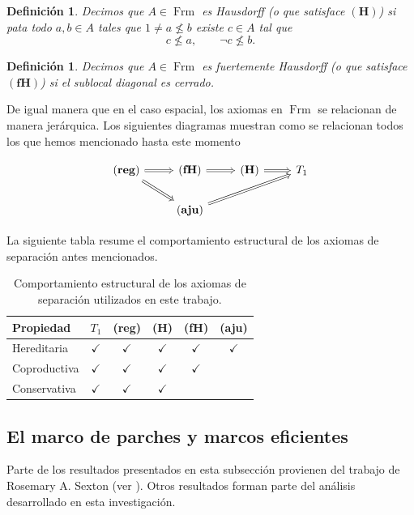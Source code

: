 \documentclass[12pt]{article}
\newtheorem{dfn}[thm]{Definición}
\DeclareMathOperator{\Frm}{Frm}
\begin{document}
\begin{dfn}\label{H}
Decimos que $A\in \Frm$ es \emph{Hausdorff} (o que satisface $\mathbf{(H)}$) si pata todo $a, b\in A$ tales que $1\neq a\nleq b$ existe $c\in A$ tal que
\[
c\nleq a, \qquad \neg c\nleq b.
\]
\end{dfn}

\begin{dfn}\label{fH}
Decimos que $A\in \Frm$ es \emph{fuertemente Hausdorff} (o que satisface $\mathbf{(fH)}$) si el sublocal diagonal es cerrado.
\end{dfn}

De igual manera que en el caso espacial, los axiomas en $\Frm$ se relacionan de manera jerárquica. Los siguientes diagramas muestran
como se relacionan todos los que hemos mencionado hasta este momento

\[\begin{tikzcd}
	{\mathbf{(reg)}} & {\mathbf{(fH)}} & {\mathbf{(H)}} & {T_1} \\
	& {\mathbf{(aju)}}
	\arrow[Rightarrow, from=1-1, to=1-2]
	\arrow[Rightarrow, from=1-1, to=2-2]
	\arrow[Rightarrow, from=1-2, to=1-3]
	\arrow[Rightarrow, from=1-3, to=1-4]
	\arrow[Rightarrow, from=2-2, to=1-4]
\end{tikzcd}\]

La siguiente tabla resume el comportamiento estructural de los axiomas de separación antes mencionados.
\begin{table}[htbp]
\centering
\begin{tabular}{lccccc}
\toprule
Propiedad & $T_1$ & (reg) & (H) & (fH) & (aju) \\
\midrule
Hereditaria & $\checkmark$ & $\checkmark$ & $\checkmark$ & $\checkmark$ & $\checkmark$ \\
Coproductiva & $\checkmark$ & $\checkmark$ & $\checkmark$ & $\checkmark$ &  \\
Conservativa & $\checkmark$ & $\checkmark$ & $\checkmark$ &  &  \\
\bottomrule
\end{tabular}
\caption{Comportamiento estructural de los axiomas de separación utilizados en este trabajo.}
\end{table}

\subsection{El marco de parches y marcos eficientes}
Parte de los resultados presentados en esta subsección provienen del trabajo de Rosemary A. Sexton (ver \cite{sexton2003point,sexton2006ordinal,sexton2006point}). 
Otros resultados forman parte del análisis desarrollado en esta investigación.\\
\end{document}
